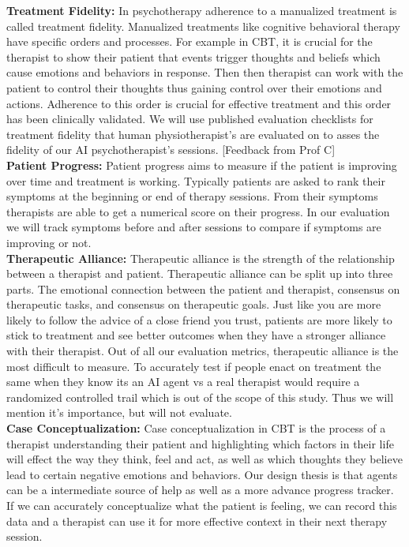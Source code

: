 \documentclass[twoside]{report}
\begin{document}
\textbf{Treatment Fidelity:} In psychotherapy adherence to a manualized treatment is called treatment fidelity. Manualized treatments like cognitive behavioral therapy have specific orders and processes. For example in CBT, it is crucial for the therapist to show their patient that events trigger thoughts and beliefs which cause emotions and behaviors in response. Then then therapist can work with the patient to control their thoughts thus gaining control over their emotions and actions. Adherence to this order is crucial for effective treatment and this order has been clinically validated. We will use published evaluation checklists for treatment fidelity that human physiotherapist's are evaluated on to asses the fidelity of our AI psychotherapist's sessions. [Feedback from Prof C] \\

\textbf{Patient Progress:} Patient progress aims to measure if the patient is improving over time and treatment is working. Typically patients are asked to rank their symptoms at the beginning or end of therapy sessions. From their symptoms therapists are able to get a numerical score on their progress. In our evaluation we will track symptoms before and after sessions to compare if symptoms are improving or not.\\

\textbf{Therapeutic Alliance:} Therapeutic alliance is the strength of the relationship between a therapist and patient. Therapeutic alliance can be split up into three parts. The emotional connection between the patient and therapist, consensus on therapeutic tasks, and consensus on therapeutic goals. Just like you are more likely to follow the advice of a close friend you trust, patients are more likely to stick to treatment and see better outcomes when they have a stronger alliance with their therapist. Out of all our evaluation metrics, therapeutic alliance is the most difficult to measure. To accurately test if people enact on treatment the same when they know its an AI agent vs a real therapist would require a randomized controlled trail which is out of the scope of this study. Thus we will mention it's importance, but will not evaluate. \\

\textbf{Case Conceptualization:} Case conceptualization in CBT is the process of a therapist understanding their patient and highlighting which factors in their life will effect the way they think, feel and act, as well as which thoughts they believe lead to certain negative emotions and behaviors. Our design thesis is that agents can be a intermediate source of help as well as a more advance progress tracker. If we can accurately conceptualize what the patient is feeling, we can record this data and a therapist can use it for more effective context in their next therapy session. 
\end{document}
